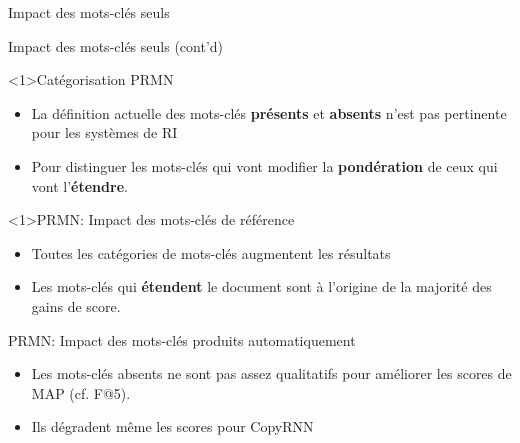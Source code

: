 \begin{frame}{Impact des mots-clés seuls}
    
\end{frame}

\begin{frame}{Impact des mots-clés seuls (cont'd)}
    
\end{frame}

\begin{frame}<1>{Catégorisation PRMN}
    
    \begin{itemize}
        \item La définition actuelle des mots-clés \textbf{présents} et \textbf{absents} n'est pas pertinente pour les systèmes de RI
        \item Pour distinguer les mots-clés qui vont modifier la \textbf{pondération} de ceux qui vont l'\textbf{étendre}.
    \end{itemize}
\end{frame}

\begin{frame}<1>{PRMN: Impact des mots-clés de référence}
    
    \begin{itemize}
        \item Toutes les catégories de mots-clés augmentent les résultats
        \item Les mots-clés qui \textbf{étendent} le document sont à l'origine de la majorité des gains de score.
    \end{itemize}
\end{frame}

\begin{frame}{PRMN: Impact des mots-clés produits automatiquement}
    
    \begin{itemize}
        \item Les mots-clés absents ne sont pas assez qualitatifs pour améliorer les scores de MAP (cf. F@5).
        \item Ils dégradent même les scores pour CopyRNN
    \end{itemize}
\end{frame}